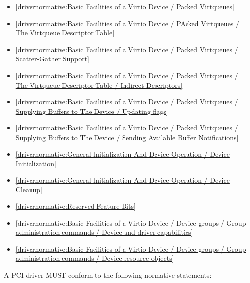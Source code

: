 \begin{itemize}
\item \ref{drivernormative:Basic Facilities of a Virtio Device / Packed Virtqueues}
\item \ref{drivernormative:Basic Facilities of a Virtio Device / PAcked Virtqueues / The Virtqueue Descriptor Table}
\item \ref{drivernormative:Basic Facilities of a Virtio Device / Packed Virtqueues / Scatter-Gather Support}
\item \ref{drivernormative:Basic Facilities of a Virtio Device / Packed Virtqueues / The Virtqueue Descriptor Table / Indirect Descriptors}
\item \ref{drivernormative:Basic Facilities of a Virtio Device / Packed Virtqueues / Supplying Buffers to The Device / Updating flags}
\item \ref{drivernormative:Basic Facilities of a Virtio Device / Packed Virtqueues / Supplying Buffers to The Device / Sending Available Buffer Notifications}
\item \ref{drivernormative:General Initialization And Device Operation / Device Initialization}
\item \ref{drivernormative:General Initialization And Device Operation / Device Cleanup}
\item \ref{drivernormative:Reserved Feature Bits}
\item \ref{drivernormative:Basic Facilities of a Virtio Device / Device groups / Group administration commands / Device and driver capabilities}
\item \ref{drivernormative:Basic Facilities of a Virtio Device / Device groups / Group administration commands / Device resource objects}
\end{itemize}

\label{sec:Conformance / Driver Conformance / PCI Driver Conformance}

A PCI driver MUST conform to the following normative statements:

